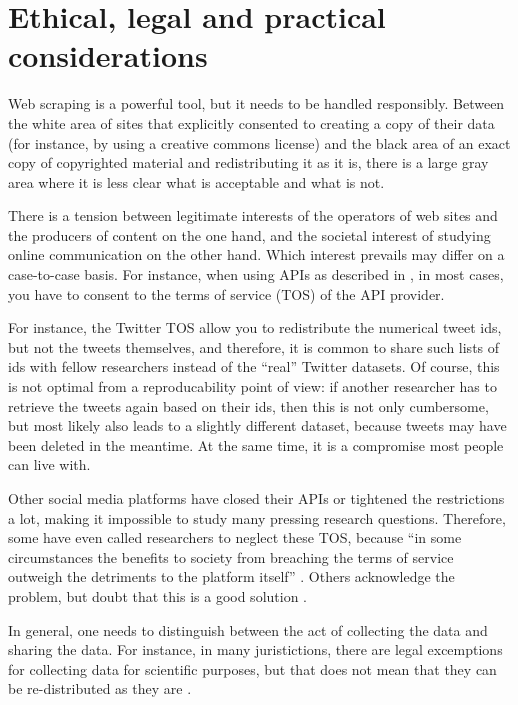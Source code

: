 \section{Ethical, legal and practical considerations}
\label{sec:ethicallegalpractical}
Web scraping is a powerful tool, but it needs to be handled
responsibly. Between the white area of sites that explicitly consented
to creating a copy of their data (for instance, by using a creative
commons license) and the black area of an exact copy of copyrighted
material and redistributing it as it is, there is a large gray area
where it is less clear what is acceptable and what is not.

There is a tension between legitimate interests of the operators of
web sites and the producers of content on the one hand, and the
societal interest of studying online communication on the other
hand. Which interest prevails may differ on a case-to-case basis. For
instance, when using APIs as described in , in most
cases, you have to consent to the terms of service (TOS) of the API
provider.

For instance, the Twitter TOS allow you to redistribute the numerical
tweet ids, but not the tweets themselves, and therefore, it is common
to share such lists of ids with fellow researchers instead of the
``real'' Twitter datasets. Of course, this is not optimal from a
reproducability point of view: if another researcher has to retrieve
the tweets again based on their ids, then this is not only cumbersome,
but most likely also leads to a slightly different dataset, because
tweets may have been deleted in the meantime. At the same time, it is
a compromise most people can live with.

Other social media platforms have closed their APIs or tightened the
restrictions a lot, making it impossible to study many pressing
research questions. Therefore, some have even called researchers to
neglect these TOS, because ``in some circumstances the benefits to
society from breaching the terms of service outweigh the detriments to
the platform itself'' \citep[p.~1561]{Bruns2019}. Others acknowledge
the problem, but doubt that this is a good solution
\citep{Puschmann2019}.

In general, one needs to distinguish between the act of collecting the
data and sharing the data. For instance, in many juristictions, there
are legal excemptions for collecting data for scientific purposes, but
that does not mean that they can be re-distributed as they are
\citep{VanAtteveldt2019}.


